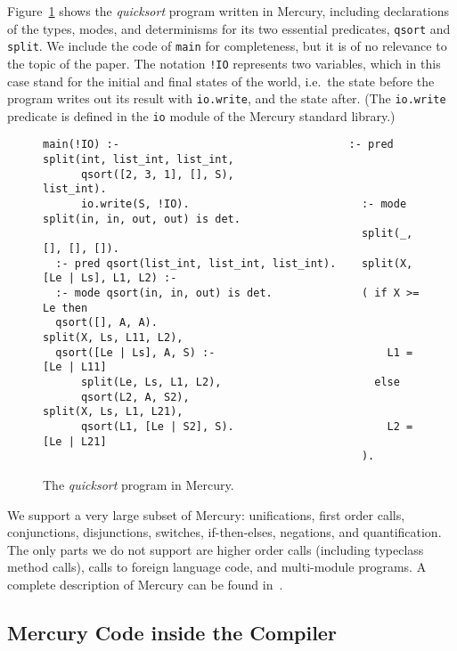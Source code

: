 \documentclass{tlp}
\newcommand{\code}[1]{{\tt#1}}
\begin{document}
\begin{example}
Figure~\ref{fig:running:normal} shows
the \emph{quicksort} program written in Mercury,
including declarations of the types, modes, and determinisms
for its two essential predicates, \code{qsort} and \code{split}.
We include the code of \code{main} for completeness,
but it is of no relevance to the topic of the paper.
The notation \code{!IO} represents two variables,
which in this case stand for the initial and final states of the world,
i.e.\ the state before the program writes out its result with \code{io.write},
and the state after.
(The \code{io.write} predicate is defined
in the \code{io} module of the Mercury standard library.)
\hfill 
\label{example:running:normal}
\end{example}
\begin{figure}
\scriptsize
\begin{Verbatim}[frame=single,framerule=0.2pt,framesep=3pt]
  main(!IO) :-                                    :- pred split(int, list_int, list_int,
      qsort([2, 3, 1], [], S),                        list_int).
      io.write(S, !IO).                           :- mode split(in, in, out, out) is det.
                                                  split(_, [], [], []).
  :- pred qsort(list_int, list_int, list_int).    split(X, [Le | Ls], L1, L2) :-
  :- mode qsort(in, in, out) is det.              ( if X >= Le then
  qsort([], A, A).                                    split(X, Ls, L11, L2),
  qsort([Le | Ls], A, S) :-                           L1 = [Le | L11]
      split(Le, Ls, L1, L2),                        else
      qsort(L2, A, S2),                               split(X, Ls, L1, L21),
      qsort(L1, [Le | S2], S).                        L2 = [Le | L21]
                                                  ).
\end{Verbatim}
\normalsize
\caption{The \emph{quicksort} program in Mercury.}
\label{fig:running:normal}
\end{figure}

We support a very large subset of Mercury:
unifications, first order calls,
conjunctions, disjunctions, switches,
if-then-elses, negations, and quantification.
The only parts we do not support are higher order calls
(including typeclass method calls),
calls to foreign language code,
and multi-module programs.
A complete description of Mercury can be found in~\cite{mercury_refman}.

\subsection{Mercury Code inside the Compiler}
\label{seCbgCinternal}
\end{document}
